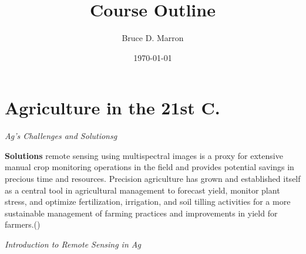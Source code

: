 \documentclass[12pt, letterpaper]{article}
\title{\vspace{-15mm}\fontsize{14pt}{10pt}
                    \selectfont \textbf{Course Outline}   %
                    \vspace{-7mm}
      }
\author{
     \normalsize Bruce D. Marron \\                     %
     \vspace{-5mm}
}
\date{\normalsize \today}
\begin{document}
\begin{singlespacing}
\end{singlespacing}
\thispagestyle{fancy}                            %


\section{Agriculture in the 21st C.}

\large
\begin{flushleft}
\textit{Ag's Challenges and Solutionsg}
\end{flushleft}
\normalsize

\begin{outline}[enumerate]
\1 \textbf{Solutions}
\2 remote sensing using multispectral images is a proxy for extensive manual crop monitoring operations in the field and provides potential savings in precious time and resources. Precision agriculture has grown and established itself as a central tool in agricultural management to forecast yield, monitor plant stress, and optimize fertilization, irrigation, and soil tilling activities for a more sustainable management of farming practices and improvements in yield for farmers.(\cite{segarra_remote_2020})


\end{outline}


\large
\begin{flushleft}
\textit{Introduction to Remote Sensing in Ag}
\end{flushleft}
\normalsize
\end{document}
